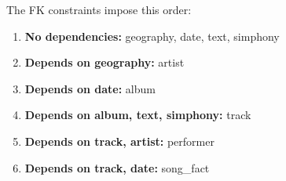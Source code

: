 The FK constraints impose this order:

\begin{enumerate}
    \item \textbf{No dependencies:} geography, date, text, simphony
    \item \textbf{Depends on geography:} artist
    \item \textbf{Depends on date:} album
    \item \textbf{Depends on album, text, simphony:} track
    \item \textbf{Depends on track, artist:} performer
    \item \textbf{Depends on track, date:} song\_fact
\end{enumerate}
